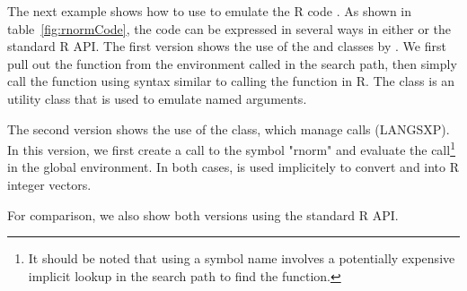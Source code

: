 The next example shows how to use  to emulate the R code
.
%
As shown in table~\ref{fig:rnormCode}, the code can be expressed in several
ways in either  or the standard R API. The first version shows the
use of the  and  classes by
.
%
%
We first pull out the  function from the environment 
called  in the search path, then simply call the function 
using syntax similar to calling the function in R. The  
class is an utility class that is used to emulate named arguments.

The second version shows the use of the  class, which 
manage calls (LANGSXP). 
%
%
In this version, we first create a call to the symbol "rnorm" and
evaluate the call\footnote{It should be noted that using a symbol name
involves a potentially expensive implicit lookup in the search path
to find the  function.} in the global environment. In both cases, 
is used implicitely to convert  and  
into R integer vectors. 

For comparison, we also show both versions using the standard R API.
% 
%


%

